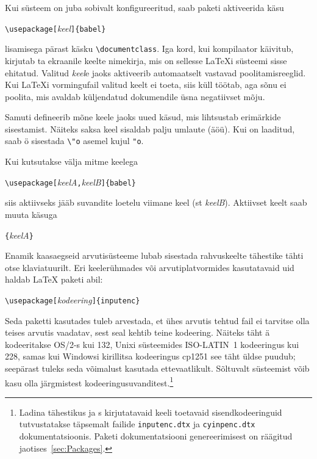 Kui süsteem on juba sobivalt konfigureeritud, saab paketi 
aktiveerida käsu
\begin{lscommand}
\verb|\usepackage[|\emph{keel}\verb|]{babel}|
\end{lscommand}
\noindent lisamisega pärast käsku \verb|\documentclass|. Iga kord, kui
kompilaator käivitub, kirjutab ta ekraanile keelte nimekirja, mis on
sellesse \LaTeX i süsteemi sisse ehitatud. Valitud \emph{keel}e jaoks
aktiveerib  automaatselt vastavad poolitamisreeglid. Kui
\LaTeX i vormingufail valitud keelt ei toeta, siis  küll
töötab, aga sõnu ei poolita, mis avaldab küljendatud dokumendile üsna
negatiivset mõju.

Samuti defineerib  mõne keele jaoks uued käsud, mis
lihtsustab erimärkide sisestamist. Näiteks saksa keel sisaldab
palju umlaute (\"a\"o\"u). Kui  on laaditud, saab \"o
sisestada \verb|\"o| asemel kujul \verb|"o|.

Kui  kutsutakse välja mitme keelega
\begin{lscommand}
\verb|\usepackage[|\emph{keelA}\verb|,|\emph{keelB}\verb|]{babel}|
\end{lscommand}
\noindent siis aktiivseks jääb suvandite loetelu viimane keel (st
\emph{keelB}). Aktiivset keelt saab muuta käsuga
\begin{lscommand}
\verb|{|\emph{keelA}\verb|}|
\end{lscommand}

\newcommand{\ieih}[1]{%
\index{sisendkodeering!#1@\texttt{#1}}%
\index{#1@\texttt{#1}}}
\newcommand{\iei}[1]{%
\ieih{#1}\texttt{#1}}
\newcommand{\feih}[1]{%
\index{kirjakodeering!#1@\texttt{#1}}%
\index{#1@\texttt{#1}}}
\newcommand{\fei}[1]{%
\feih{#1}\texttt{#1}}

\pagebreak[2]Enamik kaasaegseid arvutisüsteeme lubab sisestada
rahvuskeelte tähestike tähti otse klaviatuurilt. Eri keelerühmades või
arvutiplatvormides kasutatavaid uid haldab \LaTeX{}
paketi  abil:%
\begin{lscommand}
\verb|\usepackage[|\emph{kodeering}\verb|]{inputenc}|
\end{lscommand}

Seda paketti kasutades tuleb arvestada, et ühes arvutis tehtud
fail ei tarvitse olla teises arvutis vaadatav, sest
seal kehtib teine kodeering. Näiteks täht \"a kodeeritakse OS/2-s kui
132, Unixi süsteemides ISO-LATIN~1 kodeeringus kui 228, samas kui
Windowsi kirillitsa kodeeringus cp1251 see täht üldse
puudub; seepärast tuleks seda võimalust kasutada ettevaatlikult.
Sõltuvalt süsteemist võib kasu olla järgmistest
kodeeringusuvanditest.\footnote{Ladina tähestikus ja s
kirjutatavaid keeli toetavaid sisendkodeeringuid tutvustatakse täpsemalt
failide \texttt{inputenc.dtx} ja \texttt{cyinpenc.dtx}
dokumentatsioonis. Paketi dokumentatsiooni genereerimisest on räägitud
jaotises~\ref{sec:Packages}.}

